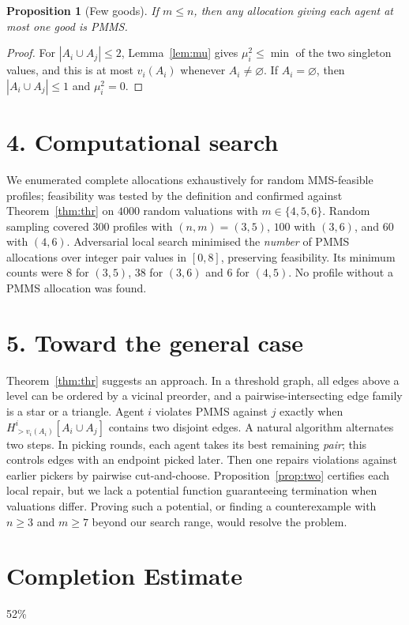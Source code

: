 \documentclass[11pt]{article}
\newtheorem{proposition}[theorem]{Proposition}
\theoremstyle{definition}
\begin{document}
\begin{proposition}[Few goods]\label{prop:few}
If $m\le n$, then any allocation giving each agent at most one good is PMMS.
\end{proposition}
\begin{proof}
For $|A_i\cup A_j|\le2$, Lemma~\ref{lem:mu} gives $\mu^2_i\le\min$ of the two singleton values, and this is at most
$v_i(A_i)$ whenever $A_i\ne\varnothing$. If $A_i=\varnothing$, then $|A_i\cup A_j|\le1$ and $\mu^2_i=0$.
\end{proof}

\section*{4. Computational search}
We enumerated complete allocations exhaustively for random MMS-feasible profiles; feasibility was tested by the
definition and confirmed against Theorem~\ref{thm:thr} on $4000$ random valuations with $m\in\{4,5,6\}$. Random sampling
covered $300$ profiles with $(n,m)=(3,5)$, $100$ with $(3,6)$, and $60$ with $(4,6)$. Adversarial local search minimised the
\emph{number} of PMMS allocations over integer pair values in $[0,8]$, preserving feasibility. Its minimum counts were $8$
for $(3,5)$, $38$ for $(3,6)$ and $6$ for $(4,5)$. No profile without a PMMS allocation was found.

\section*{5. Toward the general case}
Theorem~\ref{thm:thr} suggests an approach. In a threshold graph, all edges above a level can be ordered by a vicinal
preorder, and a pairwise-intersecting edge family is a star or a triangle. Agent $i$ violates PMMS against $j$ exactly when
$H^i_{>v_i(A_i)}[A_i\cup A_j]$ contains two disjoint edges. A natural algorithm alternates two steps. In picking rounds, each
agent takes its best remaining \emph{pair}; this controls edges with an endpoint picked later. Then one repairs violations
against earlier pickers by pairwise cut-and-choose. Proposition~\ref{prop:two} certifies each local repair, but we lack a
potential function guaranteeing termination when valuations differ. Proving such a potential, or finding a counterexample
with $n\ge3$ and $m\ge7$ beyond our search range, would resolve the problem.

\section{Completion Estimate}
52\%
\end{document}
